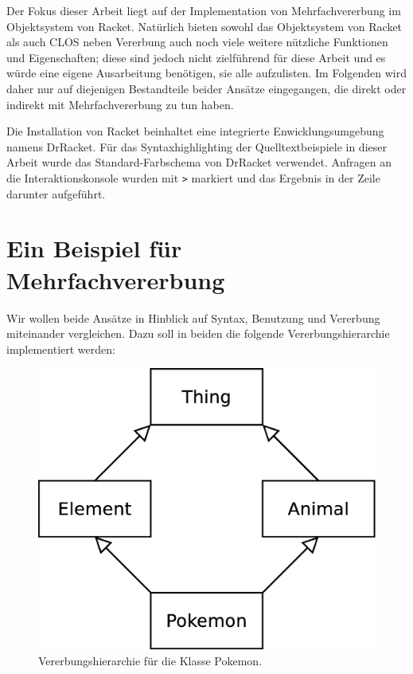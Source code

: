 Der Fokus dieser Arbeit liegt auf der Implementation von Mehrfachvererbung im Objektsystem von Racket. Natürlich bieten sowohl das Objektsystem von Racket als auch CLOS neben Vererbung auch noch viele weitere nützliche Funktionen und Eigenschaften; diese sind jedoch nicht zielführend für diese Arbeit und es würde eine eigene Ausarbeitung benötigen, sie alle aufzulisten. Im Folgenden wird daher nur auf diejenigen Bestandteile beider Ansätze eingegangen, die direkt oder indirekt mit Mehrfachvererbung zu tun haben. 

Die Installation von Racket beinhaltet eine integrierte Enwicklungsumgebung namens DrRacket. Für das Syntaxhighlighting der Quelltextbeispiele in dieser Arbeit wurde das Standard-Farbschema von DrRacket verwendet. Anfragen an die Interaktionskonsole wurden mit \texttt{>} markiert und das Ergebnis in der Zeile darunter aufgeführt. 

\section{Ein Beispiel für Mehrfachvererbung} 

Wir wollen beide Ansätze in Hinblick auf Syntax, Benutzung und Vererbung miteinander vergleichen. Dazu soll in beiden die folgende Vererbungshierarchie implementiert werden:

\begin{figure}[h]
 \centering
 \includegraphics[scale=0.3]{pictures/diamond2}
 \caption{Vererbungshierarchie für die Klasse Pokemon.}
 \label{hirarchy}
\end{figure}

